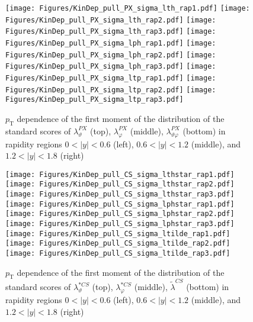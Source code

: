 \documentclass[12pt]{article}
\newcommand{\pT}{p_\mathrm{T}}
\newcommand{\absy}{\left |  y \right |}
\newcommand{\lamtildeCS}{\tilde{\lambda}^{\scriptscriptstyle CS}}
\newcommand{\lamthstarCS}{\lambda^{* \scriptscriptstyle CS}_\vartheta}
\newcommand{\lamphstarCS}{\lambda^{* \scriptscriptstyle CS}_\varphi}
\newcommand{\lamthPX}{\lambda^{\scriptscriptstyle PX}_\vartheta}
\newcommand{\lamphPX}{\lambda^{\scriptscriptstyle PX}_\varphi}
\newcommand{\lamthphPX}{\lambda^{\scriptscriptstyle PX}_{\vartheta \varphi}}
\begin{document}
\begin{figure}[htbp]
\centering
\texttt{[image: Figures/KinDep\_pull\_PX\_sigma\_lth\_rap1.pdf]}
\texttt{[image: Figures/KinDep\_pull\_PX\_sigma\_lth\_rap2.pdf]}
\texttt{[image: Figures/KinDep\_pull\_PX\_sigma\_lth\_rap3.pdf]}
\texttt{[image: Figures/KinDep\_pull\_PX\_sigma\_lph\_rap1.pdf]}
\texttt{[image: Figures/KinDep\_pull\_PX\_sigma\_lph\_rap2.pdf]}
\texttt{[image: Figures/KinDep\_pull\_PX\_sigma\_lph\_rap3.pdf]}
\texttt{[image: Figures/KinDep\_pull\_PX\_sigma\_ltp\_rap1.pdf]}
\texttt{[image: Figures/KinDep\_pull\_PX\_sigma\_ltp\_rap2.pdf]}
\texttt{[image: Figures/KinDep\_pull\_PX\_sigma\_ltp\_rap3.pdf]}
\caption{$\pT$ dependence of the first moment of the distribution of the
standard scores of $\lamthPX$ (top), $\lamphPX$ (middle), $\lamthphPX$ (bottom) in rapidity
regions $0<\absy<0.6$ (left), $0.6<\absy<1.2$ (middle), and $1.2<\absy<1.8$ (right)}
\end{figure}
\clearpage

\begin{figure}[htbp]
\centering
\texttt{[image: Figures/KinDep\_pull\_CS\_sigma\_lthstar\_rap1.pdf]}
\texttt{[image: Figures/KinDep\_pull\_CS\_sigma\_lthstar\_rap2.pdf]}
\texttt{[image: Figures/KinDep\_pull\_CS\_sigma\_lthstar\_rap3.pdf]}
\texttt{[image: Figures/KinDep\_pull\_CS\_sigma\_lphstar\_rap1.pdf]}
\texttt{[image: Figures/KinDep\_pull\_CS\_sigma\_lphstar\_rap2.pdf]}
\texttt{[image: Figures/KinDep\_pull\_CS\_sigma\_lphstar\_rap3.pdf]}
\texttt{[image: Figures/KinDep\_pull\_CS\_sigma\_ltilde\_rap1.pdf]}
\texttt{[image: Figures/KinDep\_pull\_CS\_sigma\_ltilde\_rap2.pdf]}
\texttt{[image: Figures/KinDep\_pull\_CS\_sigma\_ltilde\_rap3.pdf]}
\caption{$\pT$ dependence of the first moment of the distribution of the
standard scores of $\lamthstarCS$ (top), $\lamphstarCS$ (middle), $\lamtildeCS$ (bottom) in rapidity
regions $0<\absy<0.6$ (left), $0.6<\absy<1.2$ (middle), and $1.2<\absy<1.8$ (right)}
\end{figure}
\clearpage
\end{document}
